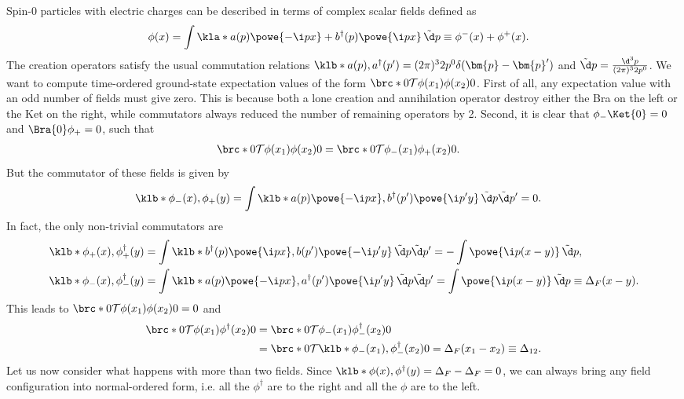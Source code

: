 \documentclass[english, parskip=full]{scrbook}
\newcommand{\example}[3]{\begin{tcolorbox}[colback=colorbackgroundexample,colframe=colorexample, breakable,enhanced,title={\textbf{#1}: #2.}]#3\end{tcolorbox}}
\begin{document}
\example{Wick's Theorem}{Complex Scalar Fields}{
Spin-0 particles with electric charges can be described in terms of complex scalar fields defined as
\begin{align}
\phi(x) &= \int \kla*{a(p)\powe{-\i px} + b^\dagger(p)\powe{\i px}} \,\tilde{\d}p \equiv \phi^-(x)+\phi^+(x).
\end{align}
The creation operators satisfy the usual commutation relations $\klb*{a(p),a^\dagger(p')} = (2\pi)^3 2p^0 \delta(\bm{p}-\bm{p}')$ and $\tilde{\d}p = \frac{\d^3p}{(2\pi)^3 2p^0}$.
We want to compute time-ordered ground-state expectation values of the form $\brc*{0}{\mathcal{T} \phi(x_1)\phi(x_2)}{0}$.
First of all, any expectation value with an odd number of fields must give zero.
This is because both a lone creation and annihilation operator destroy either the Bra on the left or the Ket on the right, while commutators always reduced the number of remaining operators by 2.
Second, it is clear that $\phi_-\Ket{0} = 0$ and $\Bra{0}\phi_+=0$, such that
\begin{align}
\brc*{0}{\mathcal{T} \phi(x_1)\phi(x_2)}{0} &= \brc*{0}{\mathcal{T} \phi_-(x_1)\phi_+(x_2)}{0}.
\end{align}
But the commutator of these fields is given by
\begin{align}
\klb*{\phi_-(x),\phi_+(y)} &= \int \klb*{a(p)\powe{-\i px}, b^\dagger(p')\powe{\i p'y}} \,\tilde{\d}p\tilde{\d}p' = 0.
\end{align}
In fact, the only non-trivial commutators are
\begin{align}
\klb*{\phi_+(x),\phi_+^\dagger(y)} &= \int \klb*{b^\dagger(p)\powe{\i px}, b(p')\powe{-\i p'y}} \,\tilde{\d}p\tilde{\d}p' = -\int \powe{\i p(x-y)} \,\tilde{\d}p,\\
\klb*{\phi_-(x),\phi_-^\dagger(y)} &= \int \klb*{a(p)\powe{-\i px}, a^\dagger(p')\powe{\i p'y}} \,\tilde{\d}p\tilde{\d}p' = \int \powe{\i p(x-y)} \,\tilde{\d}p \equiv \Delta_F(x-y).
\end{align}
This leads to $\brc*{0}{\mathcal{T} \phi(x_1)\phi(x_2)}{0}=0$ and
\begin{align}
\brc*{0}{\mathcal{T} \phi(x_1)\phi^\dagger(x_2)}{0} &= \brc*{0}{\mathcal{T} \phi_-(x_1)\phi_-^\dagger(x_2)}{0} \\
&= \brc*{0}{\mathcal{T} \klb*{\phi_-(x_1),\phi_-^\dagger(x_2)}}{0} = \Delta_F(x_1-x_2) \equiv \Delta_{12}.
\end{align}
Let us now consider what happens with more than two fields.
Since $\klb*{\phi(x),\phi^\dagger(y)} = \Delta_F-\Delta_F=0$, we can always bring any field configuration into normal-ordered form, i.e. all the $\phi^\dagger$ are to the right and all the $\phi$ are to the left.
}
\end{document}
